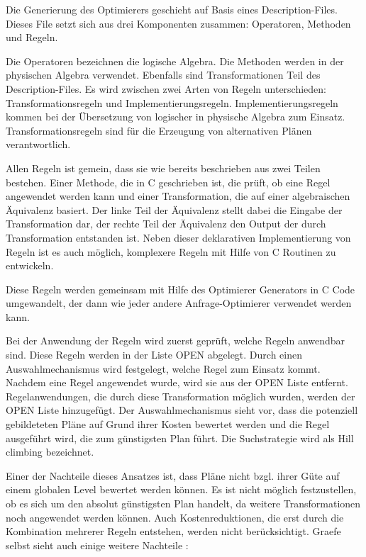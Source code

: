 Die Generierung des Optimierers geschieht auf Basis eines Description-Files. Dieses File setzt sich aus drei Komponenten zusammen: Operatoren, Methoden und Regeln.


Die Operatoren bezeichnen die logische Algebra. Die Methoden werden in der physischen Algebra verwendet. Ebenfalls sind Transformationen Teil des Description-Files. Es wird zwischen zwei Arten von Regeln unterschieden: Transformationsregeln und Implementierungsregeln. Implementierungsregeln kommen bei der Übersetzung von logischer in physische Algebra zum Einsatz. Transformationsregeln sind für die Erzeugung von alternativen Plänen verantwortlich.

Allen Regeln ist gemein, dass sie wie bereits beschrieben aus zwei Teilen bestehen. Einer Methode, die in C geschrieben ist, die prüft, ob eine Regel angewendet werden kann und einer Transformation, die auf einer algebraischen Äquivalenz basiert. Der linke Teil der Äquivalenz stellt dabei die Eingabe der Transformation dar, der rechte Teil der Äquivalenz den Output der durch Transformation entstanden ist. Neben dieser deklarativen Implementierung von Regeln ist es auch möglich, komplexere Regeln mit Hilfe von C Routinen zu entwickeln.

Diese Regeln werden gemeinsam mit Hilfe des Optimierer Generators in C Code umgewandelt, der dann wie jeder andere Anfrage-Optimierer verwendet werden kann. 

Bei der Anwendung der Regeln wird zuerst geprüft, welche Regeln anwendbar sind. Diese Regeln werden in der Liste OPEN abgelegt. Durch einen Auswahlmechanismus wird festgelegt, welche Regel zum Einsatz kommt. Nachdem eine Regel angewendet wurde, wird sie aus der OPEN Liste entfernt. Regelanwendungen, die durch diese Transformation möglich wurden, werden der OPEN Liste hinzugefügt. Der Auswahlmechanismus sieht vor, dass die potenziell gebildeteten Pläne auf Grund ihrer Kosten bewertet werden und die Regel ausgeführt wird, die zum günstigsten Plan führt. Die Suchstrategie wird als Hill climbing bezeichnet.

Einer der Nachteile dieses Ansatzes ist, dass Pläne nicht bzgl. ihrer Güte auf einem globalen Level bewertet werden können. Es ist nicht möglich festzustellen, ob es sich um den absolut günstigsten Plan handelt, da weitere Transformationen noch angewendet werden können. Auch Kostenreduktionen, die erst durch die Kombination mehrerer Regeln entstehen, werden nicht berücksichtigt. Graefe selbst sieht auch einige weitere Nachteile \cite{graefe1993volcano}:

